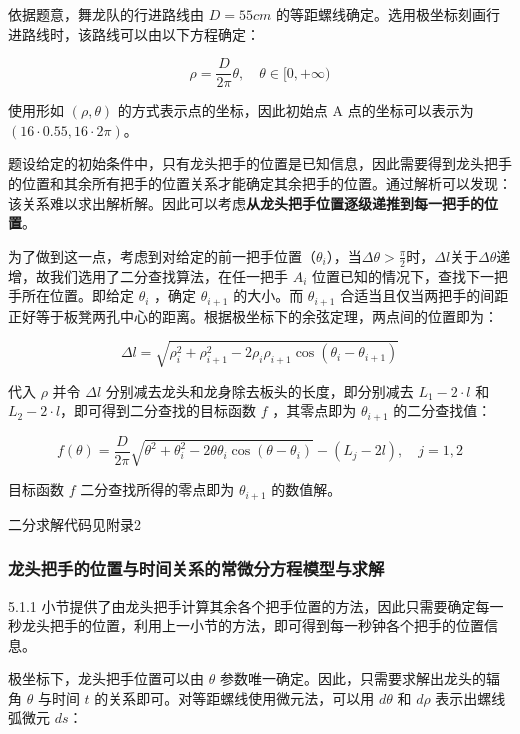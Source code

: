 \documentclass[a4paper]{article}
\begin{document}
		依据题意，舞龙队的行进路线由 $D = 55cm$ 的等距螺线确定。选用极坐标刻画行进路线时，该路线可以由以下方程确定：

		\begin{equation}
			\rho = \frac{D}{2\pi}\theta, \quad \theta \in [0,+\infty)
		\end{equation}

		使用形如 $(\rho, \theta)$ 的方式表示点的坐标，因此初始点 A 点的坐标可以表示为 $( 16 \cdot 0.55, 16 \cdot 2\pi )$。

		题设给定的初始条件中，只有龙头把手的位置是已知信息，因此需要得到龙头把手的位置和其余所有把手的位置关系才能确定其余把手的位置。通过解析可以发现：该关系难以求出解析解。因此可以考虑\textbf{从龙头把手位置逐级递推到每一把手的位置}。

		为了做到这一点，考虑到对给定的前一把手位置（$\theta_{i}$），当$\Delta \theta > \frac{\pi}{2}$时，$\Delta l$关于$\Delta \theta$递增，故我们选用了二分查找算法，在任一把手 $A_i$ 位置已知的情况下，查找下一把手所在位置。即给定 $\theta_{i}$ ，确定 $\theta_{i+1}$ 的大小。而 $\theta_{i+1}$ 合适当且仅当两把手的间距正好等于板凳两孔中心的距离。根据极坐标下的余弦定理，两点间的位置即为：

		$$\Delta l = \sqrt{\rho_i^2 + \rho_{i+1}^2 - 2\rho_i \rho_{i+1} \cos(\theta_i - \theta_{i+1})}$$

		代入 $\rho$ 并令 $\Delta l$ 分别减去龙头和龙身除去板头的长度，即分别减去 $L_1 - 2 \cdot l$ 和 $L_2 - 2 \cdot l$，即可得到二分查找的目标函数 $f$ ，其零点即为 $\theta_{i+1}$ 的二分查找值：

		\begin{equation}
			f(\theta) = \frac{D}{2\pi} \sqrt{\theta^2 + \theta_i^2 - 2\theta \theta_i \cos(\theta - \theta_i)} - (L_j - 2l), \quad j=1, 2
		\end{equation}

		目标函数 $f$ 二分查找所得的零点即为 $\theta_{i+1}$ 的数值解。

		二分求解代码见附录2 %

	\subsubsection{龙头把手的位置与时间关系的常微分方程模型与求解}

		5.1.1 小节提供了由龙头把手计算其余各个把手位置的方法，因此只需要确定每一秒龙头把手的位置，利用上一小节的方法，即可得到每一秒钟各个把手的位置信息。

		极坐标下，龙头把手位置可以由 $\theta$ 参数唯一确定。因此，只需要求解出龙头的辐角 $\theta$ 与时间 $t$ 的关系即可。对等距螺线使用微元法，可以用 $d\theta$ 和 $d\rho$ 表示出螺线弧微元 $ds$：
\end{document}
